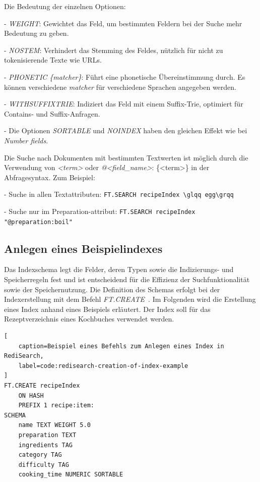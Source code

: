 Die Bedeutung der einzelnen Optionen:

- \emph{WEIGHT}: Gewichtet das Feld, um bestimmten Feldern bei der Suche mehr Bedeutung zu geben.

- \emph{NOSTEM}: Verhindert das Stemming des Feldes, nützlich für nicht zu tokenisierende Texte wie URLs.

- \emph{PHONETIC \{matcher\}}: Führt eine phonetische Übereinstimmung durch. Es können verschiedene \emph{matcher} für verschiedene Sprachen angegeben werden.

- \emph{WITHSUFFIXTRIE}: Indiziert das Feld mit einem Suffix-Trie, optimiert für Contains- und Suffix-Anfragen.

- Die Optionen \emph{SORTABLE} und \emph{NOINDEX} haben den gleichen Effekt wie bei \emph{Number fields}.

Die Suche nach Dokumenten mit bestimmten Textwerten ist möglich durch die Verwendung von \emph{<term>} oder \emph{@<field\_name>}:
\{<term>\} in der Abfragesyntax. Zum Beispiel:

- Suche in allen Textattributen:
 \lstinline|FT.SEARCH recipeIndex \glqq egg\grqq|

- Suche nur im Preparation-attribut:
 \lstinline|FT.SEARCH recipeIndex "@preparation:boil"|




\subsection{Anlegen eines Beispielindexes}
Das Indexschema legt die Felder, deren Typen sowie die Indizierungs- und Speicherregeln fest und ist entscheidend für die Effizienz der Suchfunktionalität sowie der Speichernutzung.
Die Definition des Schemas erfolgt bei der Indexerstellung mit dem Befehl \emph{FT.CREATE}~\cite{redis_ltd_ftcreate_nodate}.
Im Folgenden wird die Erstellung eines Index anhand eines Beispiels erläutert.
Der Index soll für das Rezeptverzeichnis eines Kochbuches verwendet werden.

\begin{lstlisting}[
    caption=Beispiel eines Befehls zum Anlegen eines Index in RediSearch,
    label=code:redisearch-creation-of-index-example
]
FT.CREATE recipeIndex
    ON HASH
    PREFIX 1 recipe:item:
SCHEMA
    name TEXT WEIGHT 5.0
    preparation TEXT
    ingredients TAG
    category TAG
    difficulty TAG
    cooking_time NUMERIC SORTABLE
\end{lstlisting}

